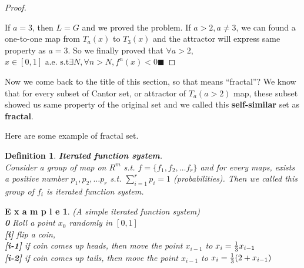 \documentclass[12pt]{article}
\theoremstyle{plain}
\newtheorem{definition}{\textbf{Definition}}[section]
\newtheorem{proof}{\textit{PROOF}}[section]
\newtheorem{example}{\textbf{E x a m p l e}}[section]
\begin{document}
{\begin{proof}
{
}

  \noindent If $a = 3$, then $L = G$ and we proved the problem. If $a > 2, a \neq 3$, we can found a one-to-one map from $T_a(x)$ to $T_3(x)$ and the attractor will express same property as $a = 3$. So we finally proved that $\forall a > 2$, $x \in[0 ,1] \text{ a.e. s.t} \exists N, \forall n > N, f^n(x) < 0 \blacksquare$

\end{proof}
}

Now we come back to the title of this section, so that means ``fractal''? We know that for every subset of Cantor set, or attractor of $T_a (a>2)$ map, these subset showed us same property of the original set and we called this \textbf{self-similar} set as \textbf{fractal}.

Here are some example of fractal set.

\begin{definition}\textbf{Iterated function system}.
\\\noindent Consider a group of map on $R^m$ s.t. $f = \{f_1, f_2, \ldots f_r\}$ and for every maps, exists a positive number $p_1, p_2, \ldots p_r$ s.t. $\sum_{i = 1}^{r} p_i = 1$ (probabilities). Then we called this group of $f_i$ is iterated function system.
\end{definition}

\begin{example} (A simple iterated function system)
\\\noindent \textbf{0} Roll a point $x_0$ randomly in $[0, 1]$
\\\noindent \textbf{[i]} flip a coin, 
\\\noindent \textbf{[i-1]} if coin comes up heads, then move the point $x_{i-1}$ to $x_i = {1\over 3} x_{i-1}$
\\\noindent \textbf{[i-2]} if coin comes up tails, then move the point $x_{i-1}$ to $x_i = {1 \over 3}(2 + x_{i-1})$
\end{example}
\end{document}
